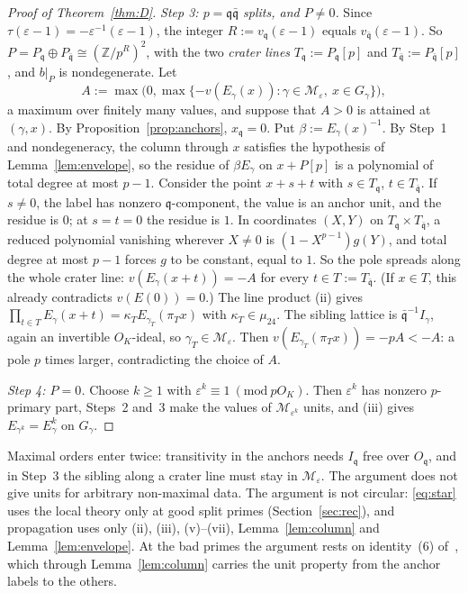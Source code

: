 \documentclass[11pt]{amsart}
\numberwithin{equation}{section}
\theoremstyle{plain}
\theoremstyle{definition}
\theoremstyle{remark}
\begin{document}
\begin{proof}[Proof of Theorem~\ref{thm:D}]
\emph{Step 3: \(p=\mathfrak q\bar{\mathfrak q}\) splits, and \(P\ne0\).} Since \(\tau(\varepsilon-1)=-\varepsilon^{-1}(\varepsilon-1)\), the integer \(R:=v_{\mathfrak q}(\varepsilon-1)\) equals \(v_{\bar{\mathfrak q}}(\varepsilon-1)\). So \(P=P_{\mathfrak q}\oplus P_{\bar{\mathfrak q}}\cong(\mathbb Z/p^R)^2\), with the two \emph{crater lines} \(T_{\mathfrak q}:=P_{\mathfrak q}[p]\) and \(T_{\bar{\mathfrak q}}:=P_{\bar{\mathfrak q}}[p]\), and \(b|_P\) is nondegenerate. Let
\[A:=\max\bigl(0,\max\{-v(E_\gamma(x)):\gamma\in\mathcal M_\varepsilon,\ x\in G_\gamma\}\bigr),\]
a maximum over finitely many values, and suppose that \(A>0\) is attained at \((\gamma,x)\). By Proposition~\ref{prop:anchors}, \(x_{\mathfrak q}=0\). Put \(\beta:=E_\gamma(x)^{-1}\). By Step~1 and nondegeneracy, the column through \(x\) satisfies the hypothesis of Lemma~\ref{lem:envelope}, so the residue of \(\beta E_\gamma\) on \(x+P[p]\) is a polynomial of total degree at most \(p-1\). Consider the point \(x+s+t\) with \(s\in T_{\mathfrak q}\), \(t\in T_{\bar{\mathfrak q}}\). If \(s\ne0\), the label has nonzero \(\mathfrak q\)-component, the value is an anchor unit, and the residue is \(0\); at \(s=t=0\) the residue is \(1\). In coordinates \((X,Y)\) on \(T_{\mathfrak q}\times T_{\bar{\mathfrak q}}\), a reduced polynomial vanishing wherever \(X\ne0\) is \((1-X^{p-1})g(Y)\), and total degree at most \(p-1\) forces \(g\) to be constant, equal to \(1\). So the pole spreads along the whole crater line: \(v(E_\gamma(x+t))=-A\) for every \(t\in T:=T_{\bar{\mathfrak q}}\). (If \(x\in T\), this already contradicts \(v(E(0))=0\).) The line product (ii) gives \(\prod_{t\in T}E_\gamma(x+t)=\kappa_TE_{\gamma_T}(\pi_Tx)\) with \(\kappa_T\in\mu_{24}\). The sibling lattice is \(\bar{\mathfrak q}^{-1}I_\gamma\), again an invertible \(O_K\)-ideal, so \(\gamma_T\in\mathcal M_\varepsilon\). Then \(v(E_{\gamma_T}(\pi_Tx))=-pA<-A\): a pole \(p\) times larger, contradicting the choice of \(A\).

\emph{Step 4: \(P=0\).} Choose \(k\ge1\) with \(\varepsilon^k\equiv1\ (\mathrm{mod}\ pO_K)\). Then \(\varepsilon^k\) has nonzero \(p\)-primary part, Steps~2 and~3 make the values of \(\mathcal M_{\varepsilon^k}\) units, and (iii) gives \(E_{\gamma^k}=E_\gamma^k\) on \(G_\gamma\).
\end{proof}

Maximal orders enter twice: transitivity in the anchors needs \(I_{\mathfrak q}\) free over \(O_{\mathfrak q}\), and in Step~3 the sibling along a crater line must stay in \(\mathcal M_\varepsilon\). The argument does not give units for arbitrary non-maximal data. The argument is not circular: \eqref{eq:star} uses the local theory only at good split primes (Section~\ref{sec:rec}), and propagation uses only (ii), (iii), (v)--(vii), Lemma~\ref{lem:column} and Lemma~\ref{lem:envelope}. At the bad primes the argument rests on identity~(6) of~\cite{RW}, which through Lemma~\ref{lem:column} carries the unit property from the anchor labels to the others.
\end{document}
